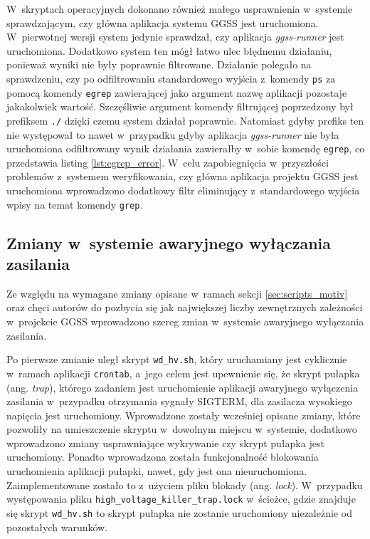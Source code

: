 W~skryptach operacyjnych dokonano również małego usprawnienia w~systemie sprawdzającym, czy główna aplikacja systemu GGSS jest uruchomiona. W~pierwotnej wersji system jedynie sprawdzał, czy aplikacja \emph{ggss-runner} jest uruchomiona. Dodatkowo system ten mógł łatwo ulec błędnemu działaniu, ponieważ wyniki nie były poprawnie filtrowane. Działanie polegało na sprawdzeniu, czy po odfiltrowaniu standardowego wyjścia z~komendy \lstinline{ps} za pomocą komendy \lstinline{egrep} zawierającej jako argument nazwę aplikacji pozostaje jakakolwiek wartość. Szczęśliwie argument komendy filtrującej poprzedzony był prefiksem \lstinline{./} dzięki czemu system działał poprawnie. Natomiast gdyby prefiks ten nie występował to nawet w~przypadku gdyby aplikacja \emph{ggss-runner} nie była uruchomiona odfiltrowany wynik działania zawierałby w~sobie komendę \lstinline{egrep}, co przedstawia listing \ref{lst:egrep_error}. W~celu zapobiegnięcia w~przyszłości problemów z~systemem weryfikowania, czy główna aplikacja projektu GGSS jest uruchomiona wprowadzono dodatkowy filtr eliminujący z~standardowego wyjścia wpisy na temat komendy \lstinline{grep}.



\subsection{Zmiany w~systemie awaryjnego wyłączania zasilania}
Ze względu na wymagane zmiany opisane w~ramach sekcji \ref{sec:scripts_motiv} oraz chęci autorów do pozbycia się jak największej liczby zewnętrznych zależności w~projekcie GGSS wprowadzono szereg zmian w~systemie awaryjnego wyłączania zasilania.

Po pierwsze zmianie uległ skrypt \lstinline{wd_hv.sh}, który uruchamiany jest cyklicznie w~ramach aplikacji \lstinline{crontab}, a~jego celem jest upewnienie się, że skrypt pułapka (ang. \emph{trap}), którego zadaniem jest uruchomienie aplikacji awaryjnego wyłączenia zasilania w~przypadku otrzymania sygnały SIGTERM, dla zasilacza wysokiego napięcia jest uruchomiony. Wprowadzone zostały wcześniej opisane zmiany, które pozwoliły na umieszczenie skryptu w~dowolnym miejscu w~systemie, dodatkowo wprowadzono zmiany usprawniające wykrywanie czy skrypt pułapka jest uruchomiony. Ponadto wprowadzona została funkcjonalność blokowania uruchomienia aplikacji pułapki, nawet, gdy jest ona nieuruchomiona. Zaimplementowane zostało to z~użyciem pliku blokady (ang. \emph{lock}). W~przypadku występowania pliku \lstinline{high_voltage_killer_trap.lock} w~ścieżce, gdzie znajduje się skrypt \lstinline{wd_hv.sh} to skrypt pułapka nie zostanie uruchomiony niezależnie od pozostałych warunków.

